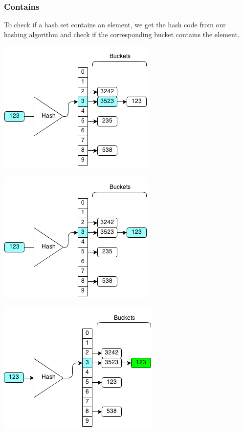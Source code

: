 \documentclass[11pt,oneside]{book}
\makeatletter
\def\maxwidth#1{\ifdim\Gin@nat@width>#1 #1\else\Gin@nat@width\fi}
\makeatother
\begin{document}
\subsubsection{Contains}

To check if a hash set contains an element, we get the hash code from our hashing algorithm and check if the corresponding bucket contains the element.

\vspace{5px}\includegraphics[width=\maxwidth{\textwidth}]{hashsetcontains.png}

\vspace{5px}\includegraphics[width=\maxwidth{\textwidth}]{hashsetcontains2.png}

\vspace{5px}\includegraphics[width=\maxwidth{\textwidth}]{hashsetcontains3.png}
\end{document}
